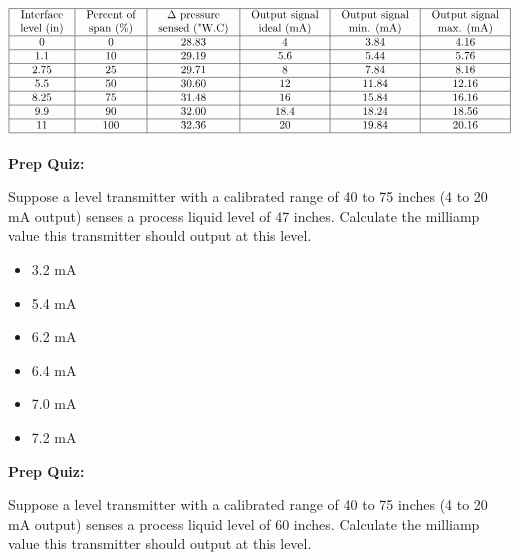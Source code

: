 $$\vbox{\offinterlineskip
\halign{\strut
\vrule \quad\hfil # \ \hfil & 
\vrule \quad\hfil # \ \hfil & 
\vrule \quad\hfil # \ \hfil & 
\vrule \quad\hfil # \ \hfil & 
\vrule \quad\hfil # \ \hfil & 
\vrule \quad\hfil # \ \hfil \vrule \cr
\noalign{\hrule}
%
Interface & Percent of & $\Delta$ pressure & Output signal & Output signal & Output signal \cr
%
level (in) & span (\%) & sensed ("W.C) & ideal (mA) & min. (mA) & max. (mA) \cr
%
\noalign{\hrule}
%
0 & 0 & 28.83 & 4 & 3.84 & 4.16 \cr
%
\noalign{\hrule}
%
1.1 & 10 & 29.19 & 5.6 & 5.44 & 5.76 \cr
%
\noalign{\hrule}
%
2.75 & 25 & 29.71 & 8 & 7.84 & 8.16 \cr
%
\noalign{\hrule}
%
5.5 & 50 & 30.60 & 12 & 11.84 & 12.16 \cr
%
\noalign{\hrule}
%
8.25 & 75 & 31.48 & 16 & 15.84 & 16.16 \cr
%
\noalign{\hrule}
%
9.9 & 90 & 32.00 & 18.4 & 18.24 & 18.56 \cr
%
\noalign{\hrule}
%
11 & 100 & 32.36 & 20 & 19.84 & 20.16 \cr
%
\noalign{\hrule}
} %
}$$ %












\vfil \eject

\noindent
{\bf Prep Quiz:}

Suppose a level transmitter with a calibrated range of 40 to 75 inches (4 to 20 mA output) senses a process liquid level of 47 inches.  Calculate the milliamp value this transmitter should output at this level.

\begin{itemize}
\item{} 3.2 mA
\vskip 5pt 
\item{} 5.4 mA
\vskip 5pt 
\item{} 6.2 mA
\vskip 5pt 
\item{} 6.4 mA
\vskip 5pt 
\item{} 7.0 mA
\vskip 5pt 
\item{} 7.2 mA
\end{itemize}






\vfil \eject

\noindent
{\bf Prep Quiz:}

Suppose a level transmitter with a calibrated range of 40 to 75 inches (4 to 20 mA output) senses a process liquid level of 60 inches.  Calculate the milliamp value this transmitter should output at this level.

